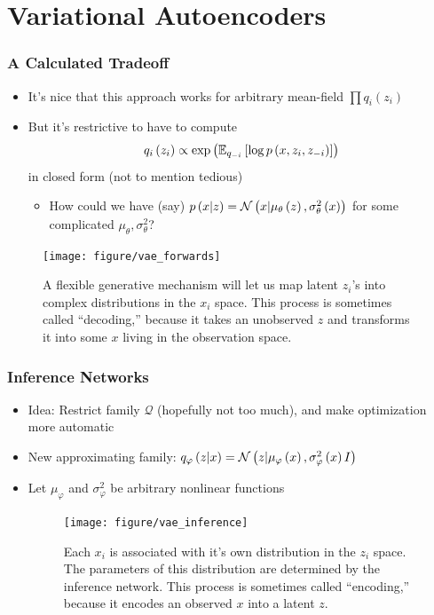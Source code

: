 \documentclass[10pt,mathserif]{beamer}
\begin{document}
\section{Variational Autoencoders}

\begin{frame}
  \frametitle{A Calculated Tradeoff}
  \begin{itemize}
  \item It's nice that this approach works for arbitrary mean-field $\prod
    q_{i}\left(z_i\right)$
  \item But it's restrictive to have to compute
    \begin{align*}
      q_i\left(z_i\right) \propto \operatorname{exp}\left(\mathbb{E}_{q_{-i}}\left[{\log p\left(x, z_i, z_{-i}\right)}\right]\right)
    \end{align*}
    in closed form (not to mention tedious)
    \begin{itemize}
    \item How could we have (say) $p\left(x \vert z\right) = \mathcal{N}\left(x \vert
      \mu_{\theta}\left(z\right), \sigma^{2}_{\theta}\left(x\right)\right)$ for some
      complicated $\mu_{\theta}, \sigma^{2}_{\theta}$?
    \end{itemize}
  \end{itemize}
\begin{figure}[ht]
  \centering
  \texttt{[image: figure/vae\_forwards]}
  \caption{A flexible generative mechanism will let us map latent $z_i$'s into
    complex distributions in the $x_i$ space. This process is sometimes called
    ``decoding,'' because it takes an unobserved $z$ and transforms it into some
    $x$ living in the observation space. \label{fig:vae_forwards} }
\end{figure}

\end{frame}

\begin{frame}
  \frametitle{Inference Networks}
  \begin{itemize}
  \item Idea: Restrict family $\mathcal{Q}$ (hopefully not too much), and make
    optimization more automatic
  \item New approximating family: $q_{\varphi}\left(z \vert x\right) = \mathcal{N}\left(z \vert
    \mu_{\varphi}\left(x\right), \sigma^{2}_{\varphi}\left(x\right) I\right)$
  \item Let $\mu_{\varphi}$ and $\sigma^{2}_{\varphi}$ be arbitrary nonlinear
    functions
    \begin{figure}
        \centering
        \texttt{[image: figure/vae\_inference]}
        \caption{Each $x_i$ is associated with it's own distribution in the
          $z_i$ space. The parameters of this distribution are determined by the
          inference network. This process is sometimes called ``encoding,''
          because it encodes an observed $x$ into a latent
          $z$. \label{fig:vae_inference} }
    \end{figure}
  \end{itemize}
\end{frame}
\end{document}
